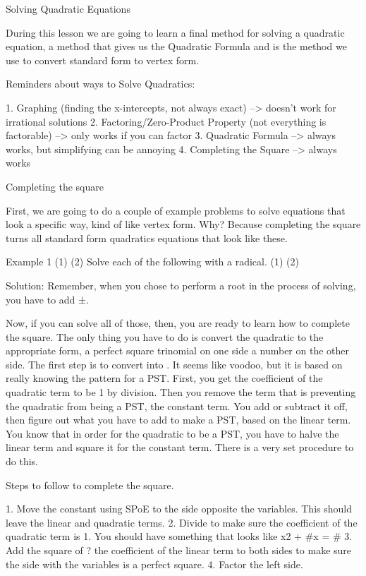 Solving Quadratic Equations

During this lesson we are going to learn a final method for solving a quadratic equation, a method that gives us the Quadratic Formula and is the method we use to convert standard form to vertex form.

Reminders about ways to Solve Quadratics:

1. Graphing (finding the x-intercepts, not always exact) --> doesn't work for irrational solutions
2. Factoring/Zero-Product Property (not everything is factorable) --> only works if you can factor
3. Quadratic Formula --> always works, but simplifying can be annoying
4. Completing the Square --> always works

Completing the square

First, we are going to do a couple of example problems to solve equations that look a specific way, kind of like vertex form. Why? Because completing the square turns all standard form quadratics equations that look like these.

Example 1
(1) 		
(2)
Solve each of the following with a radical. 
(1) 
(2) 

Solution:
Remember, when you chose to perform a root in the process of solving, you have to add ±.


		
Now, if you can solve all of those, then, you are ready to learn how to complete the square. The only thing you have to do is convert the quadratic to the appropriate form, a perfect square trinomial on one side a number on the other side. The first step is to convert into . It seems like voodoo, but it is based on really knowing the pattern for a PST. First, you get the coefficient of the quadratic term to be 1 by division. Then you remove the term that is preventing the quadratic from being a PST, the constant term. You add or subtract it off, then figure out what you have to add to make a PST, based on the linear term. You know that in order for the quadratic to be a PST, you have to halve the linear term and square it for the constant term. There is a very set procedure to do this.

Steps to follow to complete the square.

1. Move the constant using SPoE to the side opposite the variables. This should leave the linear and quadratic terms. 
2. Divide to make sure the coefficient of the quadratic term is 1. You should have something that looks like x2 + \#x = \#
3. Add the square of ? the coefficient of the linear term to both sides to make sure the side with the variables is a perfect square. 
4. Factor the left side. 

